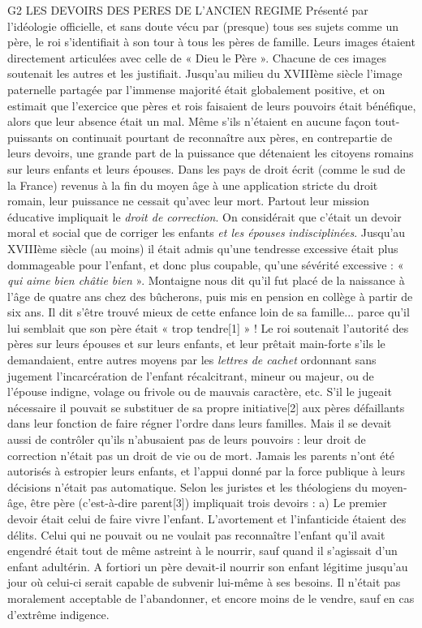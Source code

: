 G2 LES DEVOIRS DES PERES DE L'ANCIEN REGIME
 Présenté par l'idéologie officielle, et sans doute vécu par (presque) tous ses sujets comme un père, le roi s'identifiait à son tour à tous les pères de famille. Leurs images étaient directement articulées avec celle de « Dieu le Père ». Chacune de ces images soutenait les autres et les justifiait. Jusqu'au milieu du XVIIIème siècle l'image paternelle partagée par l'immense majorité était globalement positive, et on estimait que l'exercice que pères et rois faisaient de leurs pouvoirs était bénéfique, alors que leur absence était un mal.
 Même s'ils n'étaient en aucune façon tout-puissants on continuait pourtant de reconnaître aux pères, en contrepartie de leurs devoirs, une grande part de la puissance que détenaient les citoyens romains sur leurs enfants et leurs épouses. Dans les pays de droit écrit (comme le sud de la France) revenus à la fin du moyen âge à une application stricte du droit romain, leur puissance ne cessait qu'avec leur mort. Partout leur mission éducative impliquait le \emph{droit de correction}. On considérait que c'était un devoir moral et social que de corriger les enfants \emph{et les épouses} \emph{indisciplinées}. Jusqu'au XVIIIème siècle (au moins) il était admis qu'une tendresse excessive était plus dommageable pour l'enfant, et donc plus coupable, qu'une sévérité excessive : « \emph{qui aime bien châtie bien} ». Montaigne nous dit qu'il fut placé de la naissance à l'âge de quatre ans chez des bûcherons, puis mis en pension en collège à partir de six ans. Il dit s'être trouvé mieux de cette enfance loin de sa famille... parce qu'il lui semblait que son père était « trop tendre[1] » !
 Le roi soutenait l'autorité des pères sur leurs épouses et sur leurs enfants, et leur prêtait main-forte s'ils le demandaient, entre autres moyens par les \emph{lettres de cachet} ordonnant sans jugement l'incarcération de l'enfant récalcitrant, mineur ou majeur, ou de l'épouse indigne, volage ou frivole ou de mauvais caractère, etc. S'il le jugeait nécessaire il pouvait se substituer de sa propre initiative[2] aux pères défaillants dans leur fonction de faire régner l'ordre dans leurs familles. 
 Mais il se devait aussi de contrôler qu'ils n'abusaient pas de leurs pouvoirs : leur droit de correction n'était pas un droit de vie ou de mort. Jamais les parents n'ont été autorisés à estropier leurs enfants, et l'appui donné par la force publique à leurs décisions n'était pas automatique.
 Selon les juristes et les théologiens du moyen-âge, être père (c'est-à-dire parent[3]) impliquait trois devoirs : 
 a) Le premier devoir était celui de faire vivre l'enfant. L'avortement et l'infanticide étaient des délits. Celui qui ne pouvait ou ne voulait pas reconnaître l'enfant qu'il avait engendré était tout de même astreint à le nourrir, sauf quand il s'agissait d'un enfant adultérin. A fortiori un père devait-il nourrir son enfant légitime jusqu'au jour où celui-ci serait capable de subvenir lui-même à ses besoins. Il n'était pas moralement acceptable de l'abandonner, et encore moins de le vendre, sauf en cas d'extrême indigence. 
